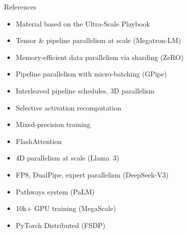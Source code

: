 \begin{frame}{References}

  \begin{itemize}
    \item Material based on the Ultra-Scale Playbook~\cite{tazi2025ultrascale}
    \item Tensor \& pipeline parallelism at scale (Megatron-LM)~\cite{shoeybi2020megatronlm}
    \item Memory-efficient data parallelism via sharding (ZeRO)~\cite{rajbhandari2020zero}
    \item Pipeline parallelism with micro-batching (GPipe)~\cite{huang2019gpipe}
    \item Interleaved pipeline schedules, 3D parallelism~\cite{narayanan2021efficient}
    \item Selective activation recomputation~\cite{korthikanti2023selective}
    \item Mixed-precision training~\cite{micikevicius2018mixed}
    \item FlashAttention~\cite{dao2022flashattention}
    \item 4D parallelism at scale (Llama~3)~\cite{grattafiori2024llama3}
    \item FP8, DualPipe, expert parallelism (DeepSeek-V3)~\cite{deepseekai2024deepseekv3}
    \item Pathways system (PaLM)~\cite{chowdhery2023palm}
    \item 10k+ GPU training (MegaScale)~\cite{jiang2024megascale}
    \item PyTorch Distributed (FSDP)~\cite{li2020pytorch}
  \end{itemize}
\end{frame}

